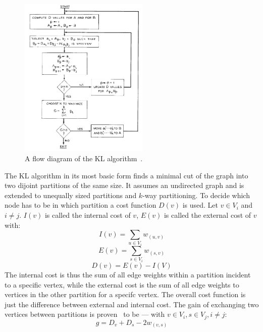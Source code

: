                 \begin{figure}[htp]
                    \begin{center}
                        \includegraphics[keepaspectratio,width=0.55\textwidth]{img/03-graphs/kl.png}
                    \end{center}
                    \caption{A flow diagram of the KL algorithm~\autocite{kl}.} 
                    \label{kl-fig}
                \end{figure}
                    
                The KL algorithm in its most basic form finds a minimal cut of the graph into two dijoint partitions of the same size. 
                It assumes an undirected graph and is extended to unequally sized partitions and $k$-way partitioning. 
                To decide which node has to be in which partition a cost function $D(v)$ is used. 
                Let $v  \in V_i$ and $i \neq j$. $I(v)$ is called the internal cost of $v$, $E(v)$ is called the external cost of $v$ with:
                \[ I(v) = \sum_{u \in V_i} w_{(u, v)} \]
                \[ E(v) = \sum_{s \in V_i} w_{(s, v)} \]
                \[   D(v) = E(v) - I(V)   \]
                The internal cost is thus the sum of all edge weights within a partition incident to a specific vertex, while the external cost is the sum of all edge weights to vertices in the other partition for a specifc vertex. 
                The overall cost function is just the difference between external and internal cost.
                The gain of exchanging two vertices between partitions is proven~\autocite{kl} to be --- with $v \in V_i, s \in V_j, i \neq j$:
                \[ g = D_v + D_s - 2 w_{(v,s)} \]
                

